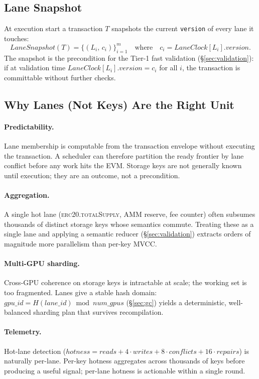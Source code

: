 \subsection{Lane Snapshot}

At execution start a transaction $T$ snapshots the current
\texttt{version} of every lane it touches:
\[
\mathit{LaneSnapshot}(T) = \{(L_i,\, c_i)\}_{i=1}^{m}
\quad \text{where} \quad
c_i = \mathit{LaneClock}[L_i].\mathit{version}.
\]
The snapshot is the precondition for the Tier-1 fast validation
(\S\ref{sec:validation}): if at validation time
$\mathit{LaneClock}[L_i].\mathit{version} = c_i$ for all $i$, the
transaction is committable without further checks.

\subsection{Why Lanes (Not Keys) Are the Right Unit}

\paragraph{Predictability.}
Lane membership is computable from the transaction envelope without
executing the transaction. A scheduler can therefore partition the
ready frontier by lane conflict before any work hits the EVM. Storage
keys are not generally known until execution; they are an outcome,
not a precondition.

\paragraph{Aggregation.}
A single hot lane (\textsc{erc20.totalSupply}, AMM reserve, fee
counter) often subsumes thousands of distinct storage keys whose
semantics commute. Treating these as a single lane and applying a
semantic reducer (\S\ref{sec:validation}) extracts orders of
magnitude more parallelism than per-key MVCC.

\paragraph{Multi-GPU sharding.}
Cross-GPU coherence on storage keys is intractable at scale; the
working set is too fragmented. Lanes give a stable hash domain:
$\mathit{gpu\_id} = H(\mathit{lane\_id}) \bmod \mathit{num\_gpus}$
(\S\ref{sec:gc}) yields a deterministic, well-balanced sharding
plan that survives recompilation.

\paragraph{Telemetry.}
Hot-lane detection
($\mathit{hotness} = \mathit{reads} + 4{\cdot}\mathit{writes} +
8{\cdot}\mathit{conflicts} + 16{\cdot}\mathit{repairs}$)
is naturally per-lane. Per-key hotness aggregates across thousands of
keys before producing a useful signal; per-lane hotness is actionable
within a single round.

